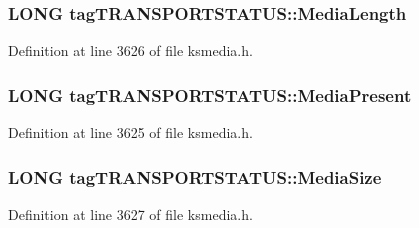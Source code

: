 \subsubsection[{\texorpdfstring{Media\+Length}{MediaLength}}]{\setlength{\rightskip}{0pt plus 5cm}L\+O\+NG tag\+T\+R\+A\+N\+S\+P\+O\+R\+T\+S\+T\+A\+T\+U\+S\+::\+Media\+Length}\hypertarget{structtag_t_r_a_n_s_p_o_r_t_s_t_a_t_u_s_a37d5662f20ca70a833d8ba3a952163b5}{}\label{structtag_t_r_a_n_s_p_o_r_t_s_t_a_t_u_s_a37d5662f20ca70a833d8ba3a952163b5}


Definition at line 3626 of file ksmedia.\+h.

\subsubsection[{\texorpdfstring{Media\+Present}{MediaPresent}}]{\setlength{\rightskip}{0pt plus 5cm}L\+O\+NG tag\+T\+R\+A\+N\+S\+P\+O\+R\+T\+S\+T\+A\+T\+U\+S\+::\+Media\+Present}\hypertarget{structtag_t_r_a_n_s_p_o_r_t_s_t_a_t_u_s_ab7d269b4c3059ccbab4077fef5730a74}{}\label{structtag_t_r_a_n_s_p_o_r_t_s_t_a_t_u_s_ab7d269b4c3059ccbab4077fef5730a74}


Definition at line 3625 of file ksmedia.\+h.

\subsubsection[{\texorpdfstring{Media\+Size}{MediaSize}}]{\setlength{\rightskip}{0pt plus 5cm}L\+O\+NG tag\+T\+R\+A\+N\+S\+P\+O\+R\+T\+S\+T\+A\+T\+U\+S\+::\+Media\+Size}\hypertarget{structtag_t_r_a_n_s_p_o_r_t_s_t_a_t_u_s_a673001d4a5aaf659e215bc30122578f2}{}\label{structtag_t_r_a_n_s_p_o_r_t_s_t_a_t_u_s_a673001d4a5aaf659e215bc30122578f2}


Definition at line 3627 of file ksmedia.\+h.


